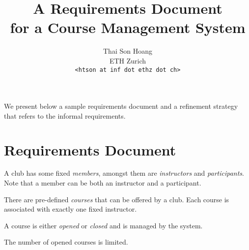 \title{A Requirements Document \\for a Course Management System}
\author{Thai Son Hoang\\ETH Zurich\\\texttt{<htson at inf dot ethz dot
    ch>}}


\maketitle

We present below a sample requirements document and a refinement
strategy that refers to the informal requirements.

\section{Requirements Document}
\label{sec:requ-docum}

A club has some fixed \emph{members}, amongst
them are \emph{instructors} and \emph{participants}.  Note that a
member can be both an instructor and a participant.
\begin{requirements}
  \ReqSpacing
\end{requirements}

There are pre-defined \emph{courses} that can be offered by a club.
Each course is associated with exactly one fixed instructor.
\begin{requirements}
  \ReqSpacing
\end{requirements}
A course is either \emph{opened} or \emph{closed} and is managed by
the system.
\begin{requirements}
  \ReqSpacing
  \ReqSpacing
\end{requirements}

The number of opened courses is limited.
\begin{requirements}
\end{requirements}

